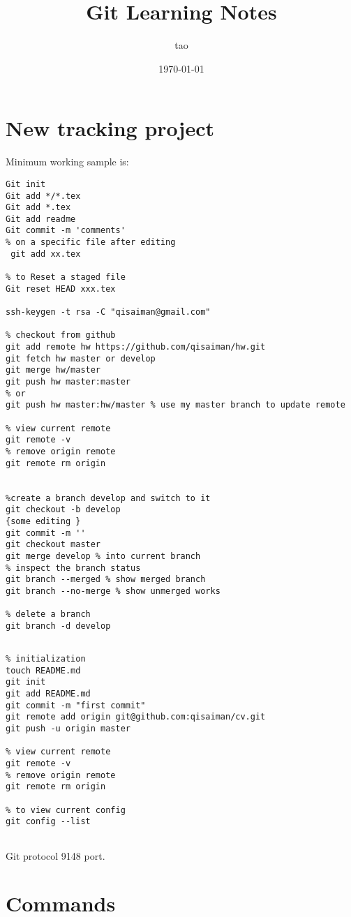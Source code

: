 \documentclass[12pt,letterpaper]{article}
\title{Git Learning Notes}
\author{tao}
\date{\today}
\begin{document}
\maketitle
\section{New tracking project}
Minimum working sample is:
\begin{lstlisting}
Git init
Git add */*.tex
Git add *.tex
Git add readme
Git commit -m 'comments'
% on a specific file after editing
 git add xx.tex

% to Reset a staged file
Git reset HEAD xxx.tex

ssh-keygen -t rsa -C "qisaiman@gmail.com"

% checkout from github
git add remote hw https://github.com/qisaiman/hw.git
git fetch hw master or develop
git merge hw/master
git push hw master:master
% or
git push hw master:hw/master % use my master branch to update remote

% view current remote
git remote -v
% remove origin remote
git remote rm origin


%create a branch develop and switch to it
git checkout -b develop
{some editing }
git commit -m ''
git checkout master
git merge develop % into current branch
% inspect the branch status
git branch --merged % show merged branch
git branch --no-merge % show unmerged works

% delete a branch
git branch -d develop


\end{lstlisting}

\begin{lstlisting}
% initialization
touch README.md
git init
git add README.md
git commit -m "first commit"
git remote add origin git@github.com:qisaiman/cv.git
git push -u origin master

% view current remote
git remote -v
% remove origin remote
git remote rm origin

% to view current config
git config --list


\end{lstlisting}
Git protocol 9148 port.

\section{Commands}
\end{document}
